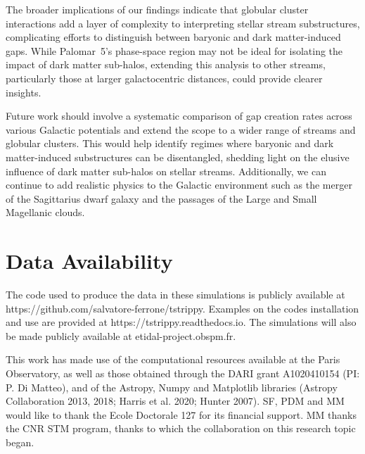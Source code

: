 \documentclass[draft]{aa}
\begin{document}
  The broader implications of our findings indicate that globular cluster interactions add a layer of complexity to interpreting stellar stream substructures, complicating efforts to distinguish between baryonic and dark matter-induced gaps. While Palomar~5's phase-space region may not be ideal for isolating the impact of dark matter sub-halos, extending this analysis to other streams, particularly those at larger galactocentric distances, could provide clearer insights. 

  Future work should involve a systematic comparison of gap creation rates across various Galactic potentials and extend the scope to a wider range of streams and globular clusters. This would help identify regimes where baryonic and dark matter-induced substructures can be disentangled, shedding light on the elusive influence of dark matter sub-halos on stellar streams. Additionally, we can continue to add realistic physics to the Galactic environment such as the merger of the Sagittarius dwarf galaxy and the passages of the Large and Small Magellanic clouds. 


  
\section*{Data Availability}

  The code used to produce the data in these simulations is publicly available at https://github.com/salvatore-ferrone/tstrippy. Examples on the codes installation and use are provided at https://tstrippy.readthedocs.io. The simulations will also be made publicly available at etidal-project.obspm.fr.



\begin{acknowledgements}
  This work has made use of the computational resources available at the Paris Observatory, as well as those obtained through the DARI grant A1020410154 (PI: P. Di Matteo), and of the Astropy, Numpy and Matplotlib libraries (Astropy Collaboration 2013, 2018; Harris et al. 2020; Hunter 2007). SF, PDM and MM would like to thank the Ecole Doctorale 127 for its financial support. MM thanks the CNR STM program, thanks to which the collaboration on this research topic began. 
\end{acknowledgements}




\end{document}
